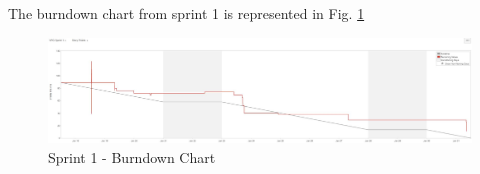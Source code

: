 \bigskip

The burndown chart from sprint 1 is represented in Fig. \ref{fig:bds1}

\begin{figure}[h]
        \centering
        \includegraphics[width = 1\textwidth]{VAPIQ-PICTURES/BDSprint1}
        \caption{Sprint 1 - Burndown Chart}
        \label{fig:bds1}
    \end{figure}  









